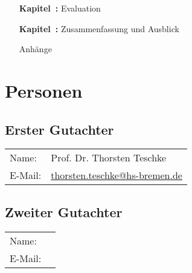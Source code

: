 \begin{enumerate}[
    labelindent=*,
    leftmargin=\widthof{\textbf{~~Kapitel~0:~}},
    label=\arabic*.
  ]
      Exemplarische Realisation
      \begin{enumerate}[label=\theenumi\arabic*.]
          \item Tokenizer
          \item Abstrakter Syntaxbaum
          \item Parser
          \item Interpreter
          \item Makro
      \end{enumerate}
    \item[\textbf{Kapitel~\arabic{enumi}:}]
      Evaluation
    \item[\textbf{Kapitel~\arabic{enumi}:}]
      Zusammenfassung und Ausblick
    \item[]
      Anhänge

  \end{enumerate}


\section{Personen}
\label{sec:personen}

  \subsection{Erster Gutachter}
  \label{ssec:erster_gutachter}
    \begin{tabular}{ll}
      Name:
        &Prof. Dr. Thorsten Teschke\\
      E-Mail:
        &\href{mailto:thorsten.teschke@hs-bremen.de}{thorsten.teschke@hs-bremen.de}\\
    \end{tabular}

  \subsection{Zweiter Gutachter}
  \label{ssec:zweiter_gutachter}
    \begin{tabular}{ll}
      Name:
        &{}\\
      E-Mail:
        &{}\\
    \end{tabular}

